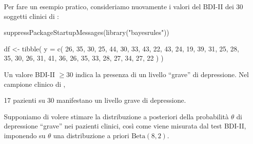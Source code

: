 \documentclass[
  11pt,
]{krantz}
\makeatletter
\newenvironment{Shaded}{\begin{snugshade}}{\end{snugshade}}
\newcommand{\AttributeTok}[1]{\textcolor[rgb]{0.61,0.61,0.61}{#1}}
\newcommand{\CommentTok}[1]{\textcolor[rgb]{0.37,0.37,0.37}{\textit{#1}}}
\newcommand{\DecValTok}[1]{\textcolor[rgb]{0.06,0.06,0.06}{#1}}
\newcommand{\FunctionTok}[1]{\textcolor[rgb]{0,0,0}{#1}}
\newcommand{\NormalTok}[1]{#1}
\newcommand{\OtherTok}[1]{\textcolor[rgb]{0.37,0.37,0.37}{#1}}
\newcommand{\SpecialCharTok}[1]{\textcolor[rgb]{0,0,0}{#1}}
\newcommand{\StringTok}[1]{\textcolor[rgb]{0.5,0.5,0.5}{#1}}
\newenvironment{kframe}{%
\medskip{}
\setlength{\fboxsep}{.8em}
 \def\at@end@of@kframe{}%
 \ifinner\ifhmode%
  \def\at@end@of@kframe{\end{minipage}}%
  \begin{minipage}{\columnwidth}%
 \fi\fi%
 \def\FrameCommand##1{\hskip\@totalleftmargin \hskip-\fboxsep
 \colorbox{shadecolor}{##1}\hskip-\fboxsep
     \hskip-\linewidth \hskip-\@totalleftmargin \hskip\columnwidth}%
 \MakeFramed {\advance\hsize-\width
   \@totalleftmargin\z@ \linewidth\hsize
   \@setminipage}}%
 {\par\unskip\endMakeFramed%
 \at@end@of@kframe}
\renewenvironment{Shaded}{\begin{kframe}}{\end{kframe}}
\theoremstyle{definition}
\theoremstyle{definition}
\theoremstyle{definition}
\theoremstyle{definition}
\theoremstyle{remark}
\makeatother
\begin{document}
Per fare un esempio pratico, consideriamo nuovamente i valori del BDI-II dei 30 soggetti clinici di \citet{zetschefuture2019}:

\begin{Shaded}
\begin{Highlighting}[]
\FunctionTok{suppressPackageStartupMessages}\NormalTok{(}\FunctionTok{library}\NormalTok{(}\StringTok{"bayesrules"}\NormalTok{))}

\NormalTok{df }\OtherTok{\textless{}{-}} \FunctionTok{tibble}\NormalTok{(}
  \AttributeTok{y =} \FunctionTok{c}\NormalTok{(}
    \DecValTok{26}\NormalTok{, }\DecValTok{35}\NormalTok{, }\DecValTok{30}\NormalTok{, }\DecValTok{25}\NormalTok{, }\DecValTok{44}\NormalTok{, }\DecValTok{30}\NormalTok{, }\DecValTok{33}\NormalTok{, }\DecValTok{43}\NormalTok{, }\DecValTok{22}\NormalTok{, }\DecValTok{43}\NormalTok{,}
    \DecValTok{24}\NormalTok{, }\DecValTok{19}\NormalTok{, }\DecValTok{39}\NormalTok{, }\DecValTok{31}\NormalTok{, }\DecValTok{25}\NormalTok{, }\DecValTok{28}\NormalTok{, }\DecValTok{35}\NormalTok{, }\DecValTok{30}\NormalTok{, }\DecValTok{26}\NormalTok{, }\DecValTok{31}\NormalTok{,}
    \DecValTok{41}\NormalTok{, }\DecValTok{36}\NormalTok{, }\DecValTok{26}\NormalTok{, }\DecValTok{35}\NormalTok{, }\DecValTok{33}\NormalTok{, }\DecValTok{28}\NormalTok{, }\DecValTok{27}\NormalTok{, }\DecValTok{34}\NormalTok{, }\DecValTok{27}\NormalTok{, }\DecValTok{22}
\NormalTok{  )}
\NormalTok{)}
\end{Highlighting}
\end{Shaded}

Un valore BDI-II \(\geq 30\) indica la presenza di un livello ``grave'' di depressione. Nel campione clinico di \citet{zetschefuture2019},

\begin{Shaded}
\end{Shaded}

17 pazienti su 30 manifestano un livello grave di depressione.

Supponiamo di volere stimare la distribuzione a posteriori della probabilità \(\theta\) di depressione ``grave'' nei pazienti clinici, così come viene misurata dal test BDI-II, imponendo su \(\theta\) una distribuzione a priori \(\mbox{Beta}(8, 2)\).
\end{document}
